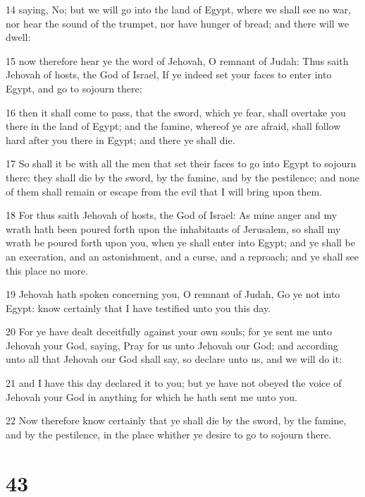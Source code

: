 \par 14 saying, No; but we will go into the land of Egypt, where we shall see no war, nor hear the sound of the trumpet, nor have hunger of bread; and there will we dwell:
\par 15 now therefore hear ye the word of Jehovah, O remnant of Judah: Thus saith Jehovah of hosts, the God of Israel, If ye indeed set your faces to enter into Egypt, and go to sojourn there;
\par 16 then it shall come to pass, that the sword, which ye fear, shall overtake you there in the land of Egypt; and the famine, whereof ye are afraid, shall follow hard after you there in Egypt; and there ye shall die.
\par 17 So shall it be with all the men that set their faces to go into Egypt to sojourn there: they shall die by the sword, by the famine, and by the pestilence; and none of them shall remain or escape from the evil that I will bring upon them.
\par 18 For thus saith Jehovah of hosts, the God of Israel: As mine anger and my wrath hath been poured forth upon the inhabitants of Jerusalem, so shall my wrath be poured forth upon you, when ye shall enter into Egypt; and ye shall be an execration, and an astonishment, and a curse, and a reproach; and ye shall see this place no more.
\par 19 Jehovah hath spoken concerning you, O remnant of Judah, Go ye not into Egypt: know certainly that I have testified unto you this day.
\par 20 For ye have dealt deceitfully against your own souls; for ye sent me unto Jehovah your God, saying, Pray for us unto Jehovah our God; and according unto all that Jehovah our God shall say, so declare unto us, and we will do it:
\par 21 and I have this day declared it to you; but ye have not obeyed the voice of Jehovah your God in anything for which he hath sent me unto you.
\par 22 Now therefore know certainly that ye shall die by the sword, by the famine, and by the pestilence, in the place whither ye desire to go to sojourn there.

\chapter{43}

